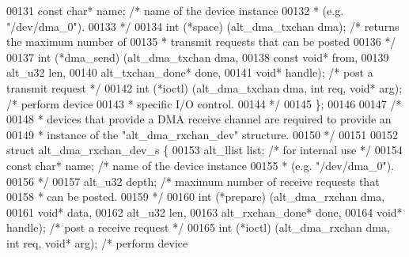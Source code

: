\begin{DoxyCode}
00131   \textcolor{keyword}{const} \textcolor{keywordtype}{char}* name;                  \textcolor{comment}{/* name of the device instance }
00132 \textcolor{comment}{                                      * (e.g. "/dev/dma\_0"). }
00133 \textcolor{comment}{                                      */}
00134   int (*space) (alt\_dma\_txchan dma); \textcolor{comment}{/* returns the maximum number of }
00135 \textcolor{comment}{                                      * transmit requests that can be posted}
00136 \textcolor{comment}{              */}
00137   int (*dma_send) (alt\_dma\_txchan dma,   
00138          \textcolor{keyword}{const} \textcolor{keywordtype}{void}* from, 
00139          alt_u32 len,
00140          alt_txchan_done* done, 
00141          \textcolor{keywordtype}{void}* handle);        \textcolor{comment}{/* post a transmit request */}
00142   int (*ioctl) (alt\_dma\_txchan dma, \textcolor{keywordtype}{int} req, \textcolor{keywordtype}{void}* arg); \textcolor{comment}{/* perform device}
00143 \textcolor{comment}{              * specific I/O control.}
00144 \textcolor{comment}{                                      */} 
00145 \};
00146 
00147 \textcolor{comment}{/*}
00148 \textcolor{comment}{ * devices that provide a DMA receive channel are required to provide an}
00149 \textcolor{comment}{ * instance of the "alt\_dma\_rxchan\_dev" structure. }
00150 \textcolor{comment}{ */}
00151 
00152 \textcolor{keyword}{struct }alt_dma_rxchan_dev_s \{
00153   alt_llist list;                    \textcolor{comment}{/* for internal use */}
00154   \textcolor{keyword}{const} \textcolor{keywordtype}{char}* name;                  \textcolor{comment}{/* name of the device instance }
00155 \textcolor{comment}{                                      * (e.g. "/dev/dma\_0"). }
00156 \textcolor{comment}{                                      */}
00157   alt_u32        depth;              \textcolor{comment}{/* maximum number of receive requests that}
00158 \textcolor{comment}{                                      * can be posted.}
00159 \textcolor{comment}{                                      */}
00160   int (*prepare) (alt\_dma\_rxchan   dma, 
00161                   \textcolor{keywordtype}{void}*            data,
00162                   alt_u32          len,
00163                   alt_rxchan_done* done,  
00164                   \textcolor{keywordtype}{void}*            handle); \textcolor{comment}{/* post a receive request */}
00165   int (*ioctl) (alt\_dma\_rxchan dma, \textcolor{keywordtype}{int} req, \textcolor{keywordtype}{void}* arg);  \textcolor{comment}{/* perform device}

\end{DoxyCode}
